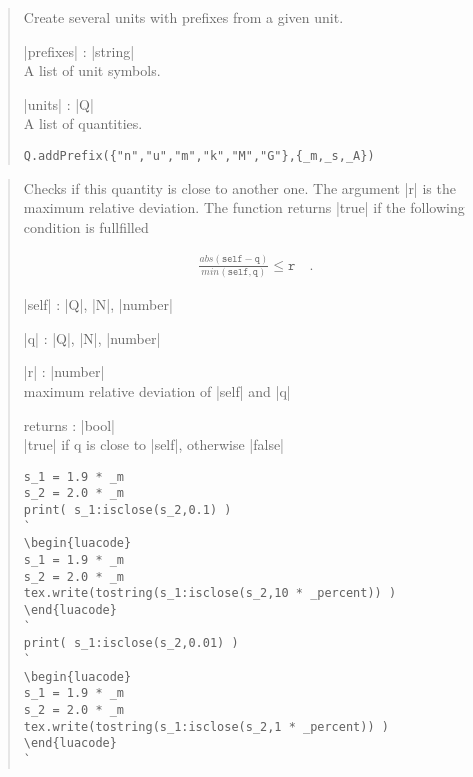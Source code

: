 \documentclass{ltxdoc}
\begin{document}
\begin{quote}
  Create several units with prefixes from a given unit.

  \begin{description}
  \item |prefixes| : |string|\\
    A list of unit symbols.

  \item |units| : |Q|\\
    A list of quantities.
  \end{description}


\begin{lstlisting}
Q.addPrefix({"n","u","m","k","M","G"},{_m,_s,_A})
\end{lstlisting}
\end{quote}



\begin{quote}
  Checks if this quantity is close to another one. The argument |r| is the maximum relative deviation. The function returns |true| if the following condition is fullfilled

  \begin{align*}
   \frac{abs(\texttt{self} - \texttt{q})}{min(\texttt{self},\texttt{q})} \leq \texttt{r} \quad.
  \end{align*}

  \begin{description}
  \item |self| : |Q|, |N|, |number|

  \item |q| : |Q|, |N|, |number| 

  \item |r| : |number|\\
    maximum relative deviation of |self| and |q|

  \item returns : |bool|\\
    |true| if q is close to |self|, otherwise |false|
  \end{description}

\begin{lstlisting}
s_1 = 1.9 * _m
s_2 = 2.0 * _m
print( s_1:isclose(s_2,0.1) )
`
\begin{luacode}
s_1 = 1.9 * _m
s_2 = 2.0 * _m
tex.write(tostring(s_1:isclose(s_2,10 * _percent)) )
\end{luacode}
`
print( s_1:isclose(s_2,0.01) )
`
\begin{luacode}
s_1 = 1.9 * _m
s_2 = 2.0 * _m
tex.write(tostring(s_1:isclose(s_2,1 * _percent)) )
\end{luacode}
`
\end{lstlisting}

\end{quote}
\end{document}
